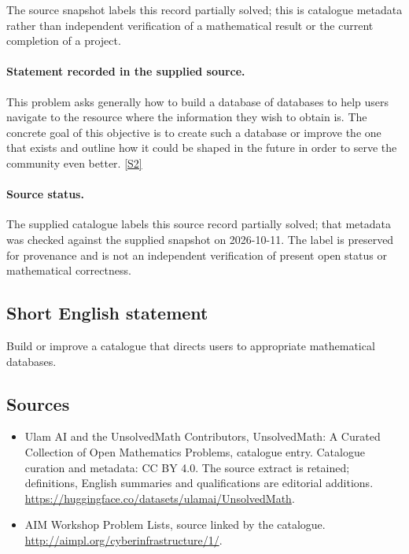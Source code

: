 \documentclass[11pt]{article}
\begin{document}
The source snapshot labels this record partially solved; this is catalogue metadata rather than independent verification of a mathematical result or the current completion of a project.
\paragraph{Statement recorded in the supplied source.}
This problem asks generally how to build a database of databases to help users navigate to the resource where the information they wish to obtain is.
The concrete goal of this objective is to create such a database or improve the one that exists and outline how it could be shaped in the future in order to serve the community even better. \href{http://aimpl.org/cyberinfrastructure/1/}{[S2]}
\paragraph{Source status.}
The supplied catalogue labels this source record partially solved; that metadata was checked against the supplied snapshot on 2026-10-11. The label is preserved for provenance and is not an independent verification of present open status or mathematical correctness.
\subsection{Short English statement}
Build or improve a catalogue that directs users to appropriate mathematical databases.
\subsection{Sources}
\begin{itemize}
\item[S1] Ulam AI and the UnsolvedMath Contributors, UnsolvedMath: A Curated Collection of Open Mathematics Problems, catalogue entry. Catalogue curation and metadata: CC BY 4.0. The source extract is retained; definitions, English summaries and qualifications are editorial additions.
\url{https://huggingface.co/datasets/ulamai/UnsolvedMath}.
\item[S2] AIM Workshop Problem Lists, source linked by the catalogue.
\url{http://aimpl.org/cyberinfrastructure/1/}.
\end{itemize}
\end{document}
